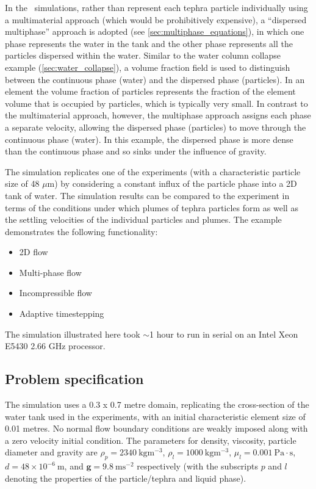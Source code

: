 In the \fluidity\ simulations, rather than represent each tephra particle individually using a multimaterial approach (which would be prohibitively expensive), a ``dispersed multiphase'' approach is adopted (see \ref{sec:multiphase_equations}), in which one phase represents the water in the tank and the other phase represents all the particles dispersed within the water. Similar to the water column collapse example (\ref{sec:water_collapse}), a volume fraction field is used to distinguish between the continuous phase (water) and the dispersed phase (particles). In an element the volume fraction of particles represents the fraction of the element volume that is occupied by particles, which is typically very small. In contrast to the multimaterial approach, however, the multiphase approach assigns each phase a separate velocity, allowing the dispersed phase (particles) to move through the continuous phase (water). In this example, the dispersed phase is more dense than the continuous phase and so sinks under the influence of gravity.

The simulation replicates one of the \cite{carey1997} experiments (with a characteristic particle size of 48 $\mu$m) by considering a constant influx of the particle phase into a 2D tank of water. The simulation results can be compared to the experiment in terms of the conditions under which plumes of tephra particles form as well as the settling velocities of the individual particles and plumes. The example demonstrates the following functionality:
\begin{itemize}
\item 2D flow
\item Multi-phase flow
\item Incompressible flow
\item Adaptive timestepping
\end{itemize}

The simulation illustrated here took $\sim$1 hour to run in serial on an Intel Xeon E5430 2.66 GHz processor.

\subsection{Problem specification}
The simulation uses a 0.3 x 0.7 metre domain, replicating the cross-section of the water tank used in the experiments, with an initial characteristic element size of 0.01 metres. No normal flow boundary conditions are weakly imposed along with a zero velocity initial condition. The parameters for density, viscosity, particle diameter and gravity are $\rho_p = 2340\ \mathrm{kgm^{-3}}$, $\rho_l = 1000\ \mathrm{kgm^{-3}}$, $\mu_l = 0.001\ \mathrm{Pa\cdot s}$, $d = 48\times 10^{-6}\ \mathrm{m}$, and $\mathbf{g} = 9.8\ \mathrm{ms^{-2}}$ respectively (with the subscripts $p$ and $l$ denoting the properties of the particle/tephra and liquid phase).

